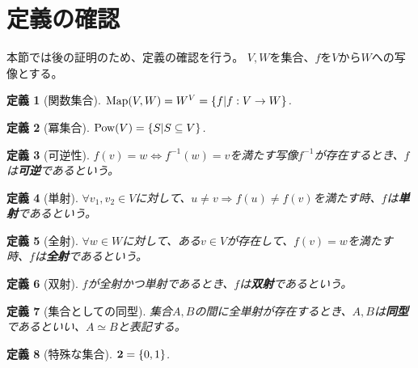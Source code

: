 \documentclass{jsarticle}
\newtheorem{Definition}{定義}
\newcommand{\Pow}{ {\rm Pow} }
\newcommand{\Map}{ {\rm Map} }
\newcommand{\2}{ {\bf 2} }
\begin{document}
\section{定義の確認}
本節では後の証明のため、定義の確認を行う。
$V,W$を集合、$f$を$V$から$W$への写像とする。
\begin{Definition}[関数集合]
    $\Map(V,W) = W^V = \{f | f:V \rightarrow W\}$.
\end{Definition}

\begin{Definition}[冪集合]
    $\Pow(V) = \{S | S \subseteq V \}$.
\end{Definition}

\begin{Definition}[可逆性]
    $f(v)=w \Leftrightarrow f^{-1}(w)=v$を満たす写像$f^{-1}$が存在するとき、$f$は{\bf 可逆}であるという。
\end{Definition}

\begin{Definition}[単射]
    $\forall v_1,v_2 \in V$に対して、$u \neq v \Rightarrow f(u) \neq f(v)$を満たす時、$f$は{\bf 単射}であるという。
\end{Definition}

\begin{Definition}[全射]
    $\forall w \in W$に対して、ある$v \in V$が存在して、$f(v)=w$を満たす時、$f$は{\bf 全射}であるという。
\end{Definition}

\begin{Definition}[双射]
    $f$が全射かつ単射であるとき、$f$は{\bf 双射}であるという。
\end{Definition}

\begin{Definition}[集合としての同型]
    集合$A,B$の間に全単射が存在するとき、$A,B$は{\bf 同型}であるといい、$A \simeq B$と表記する。
\end{Definition}

\begin{Definition}[特殊な集合]
    $\2 = \{0,1\}$.
\end{Definition}
\end{document}
